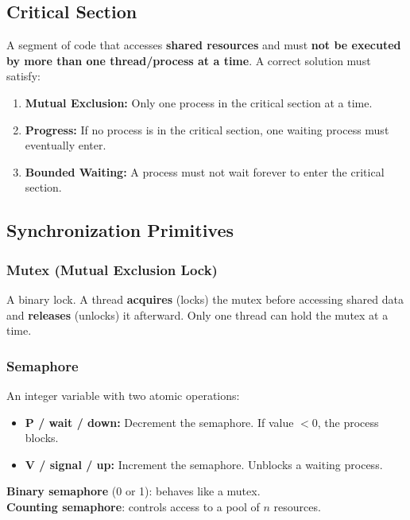 \documentclass[11pt,a4paper]{article}
\begin{document}
\subsection{Critical Section}
\begin{definitionbox}
A segment of code that accesses \textbf{shared resources} and must \textbf{not be executed by more than one thread/process at a time}. A correct solution must satisfy:
\begin{enumerate}[leftmargin=*, itemsep=2pt]
  \item \textbf{Mutual Exclusion:} Only one process in the critical section at a time.
  \item \textbf{Progress:} If no process is in the critical section, one waiting process must eventually enter.
  \item \textbf{Bounded Waiting:} A process must not wait forever to enter the critical section.
\end{enumerate}
\end{definitionbox}

\subsection{Synchronization Primitives}

\subsubsection{Mutex (Mutual Exclusion Lock)}
A binary lock. A thread \textbf{acquires} (locks) the mutex before accessing shared data and \textbf{releases} (unlocks) it afterward. Only one thread can hold the mutex at a time.

\subsubsection{Semaphore}
\begin{definitionbox}
An integer variable with two atomic operations:
\begin{itemize}[leftmargin=*]
  \item \textbf{P / wait / down:} Decrement the semaphore. If value $< 0$, the process blocks.
  \item \textbf{V / signal / up:} Increment the semaphore. Unblocks a waiting process.
\end{itemize}
\textbf{Binary semaphore} (0 or 1): behaves like a mutex.\\
\textbf{Counting semaphore}: controls access to a pool of $n$ resources.
\end{definitionbox}
\end{document}
